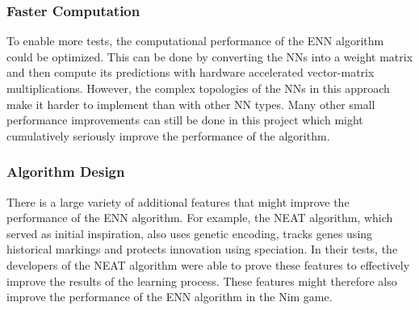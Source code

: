 \subsubsection{Faster Computation}
To enable more tests, the computational performance of the ENN algorithm could be optimized.
This can be done by converting the NNs into a weight matrix and then compute its predictions with hardware accelerated vector-matrix multiplications.
However, the complex topologies of the NNs in this approach make it harder to implement than with other NN types.
Many other small performance improvements can still be done in this project which might cumulatively seriously improve the performance of the algorithm.

\subsubsection{Algorithm Design}
There is a large variety of additional features that might improve the performance of the ENN algorithm.
For example, the NEAT algorithm, which served as initial inspiration, also uses genetic encoding, tracks genes using historical markings and protects innovation using speciation.\cite{Neat_02}
In their tests, the developers of the NEAT algorithm were able to prove these features to effectively improve the results of the learning process.
These features might therefore also improve the performance of the ENN algorithm in the Nim game.

\cleardoublepage %
\printbibliography[title=References]

